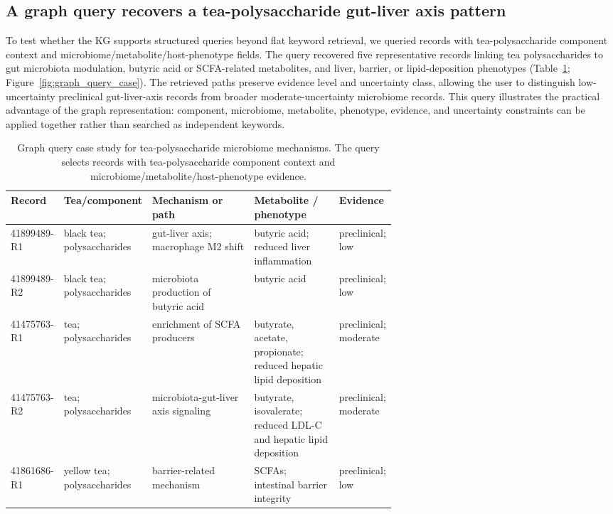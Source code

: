 \documentclass[11pt]{article}
\begin{document}
\subsection{A graph query recovers a tea-polysaccharide gut-liver axis pattern}

To test whether the KG supports structured queries beyond flat keyword retrieval, we queried records with tea-polysaccharide component context and microbiome/metabolite/host-phenotype fields. The query recovered five representative records linking tea polysaccharides to gut microbiota modulation, butyric acid or SCFA-related metabolites, and liver, barrier, or lipid-deposition phenotypes (Table~\ref{tab:graph_query_case}; Figure~\ref{fig:graph_query_case}). The retrieved paths preserve evidence level and uncertainty class, allowing the user to distinguish low-uncertainty preclinical gut-liver-axis records from broader moderate-uncertainty microbiome records. This query illustrates the practical advantage of the graph representation: component, microbiome, metabolite, phenotype, evidence, and uncertainty constraints can be applied together rather than searched as independent keywords.

\begin{table}[t]
\centering
\small
\caption{Graph query case study for tea-polysaccharide microbiome mechanisms. The query selects records with tea-polysaccharide component context and microbiome/metabolite/host-phenotype evidence.}
\label{tab:graph_query_case}
\begin{tabularx}{\linewidth}{p{0.12\linewidth}p{0.18\linewidth}Xp{0.22\linewidth}p{0.11\linewidth}}
\toprule
Record & Tea/component & Mechanism or path & Metabolite / phenotype & Evidence \\
\midrule
41899489-R1 & black tea; polysaccharides & gut-liver axis; macrophage M2 shift & butyric acid; reduced liver inflammation & preclinical; low \\
41899489-R2 & black tea; polysaccharides & microbiota production of butyric acid & butyric acid & preclinical; low \\
41475763-R1 & tea; polysaccharides & enrichment of SCFA producers & butyrate, acetate, propionate; reduced hepatic lipid deposition & preclinical; moderate \\
41475763-R2 & tea; polysaccharides & microbiota-gut-liver axis signaling & butyrate, isovalerate; reduced LDL-C and hepatic lipid deposition & preclinical; moderate \\
41861686-R1 & yellow tea; polysaccharides & barrier-related mechanism & SCFAs; intestinal barrier integrity & preclinical; low \\
\bottomrule
\end{tabularx}
\end{table}
\end{document}

